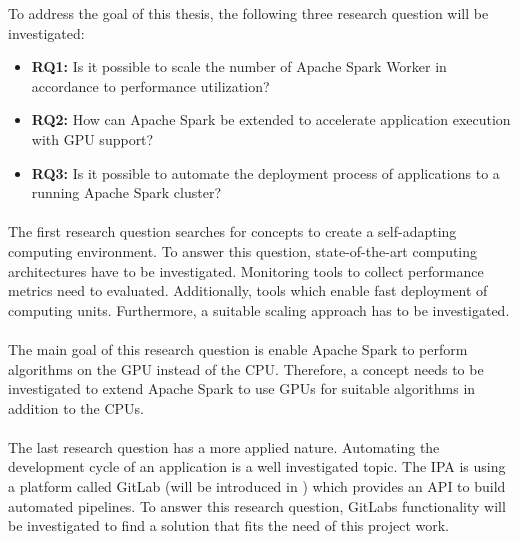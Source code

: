 To address the goal of this thesis, the following three research question will be investigated:
\begin{itemize}
\item \textbf{RQ1:} Is it possible to scale the number of Apache Spark Worker in accordance to performance utilization?
\item \textbf{RQ2:} How can Apache Spark be extended to accelerate application execution with GPU support?
\item \textbf{RQ3:} Is it possible to automate the deployment process of applications to a running Apache Spark cluster?
\end{itemize}


\paragraph{}
The first research question searches for concepts to create a self-adapting computing environment.
To answer this question, state-of-the-art computing architectures have to be investigated.
Monitoring tools to collect performance metrics need to evaluated. Additionally, tools which enable fast deployment of computing units.
Furthermore, a suitable scaling approach has to be investigated.


\paragraph{}
The main goal of this research question is enable Apache Spark to perform algorithms on the GPU instead of the CPU.
Therefore, a concept needs to be investigated to extend Apache Spark to use GPUs for suitable algorithms in addition to the CPUs.


\paragraph{}
The last research question has a more applied nature.
Automating the development cycle of an application is a well investigated topic.
The IPA is using a platform called GitLab (will be introduced in ) which provides an API to build automated pipelines.
To answer this research question, GitLabs functionality will be investigated to find a solution that fits the need of this project work.


